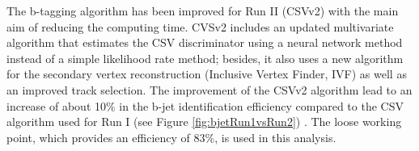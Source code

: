 \begin{table}[ht]%
\end{table}

\noindent The b-tagging algorithm has been improved for Run II (CSVv2) with the main aim of reducing
the computing time. CVSv2 includes an updated multivariate algorithm that estimates the CSV discriminator
using a neural network method instead of a simple likelihood rate method; besides, it also uses a 
new algorithm for the secondary vertex reconstruction (Inclusive Vertex Finder, IVF) as well as   
an improved track selection. The improvement of the CSVv2 algorithm lead to an increase of about 10$\%$ in 
the b-jet identification efficiency compared to the CSV algorithm used for Run I 
(see Figure \ref{fig:bjetRun1vsRun2}) \cite{PerformancebJetjetmet}. The loose working point, which provides an 
efficiency of 83$\%$, is used in this analysis.

